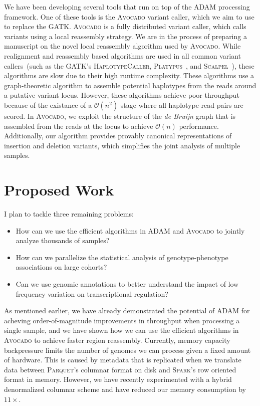 \documentclass[11pt]{article} %
\begin{document}
We have been developing several tools that run on top of the \textsc{ADAM} processing framework.
One of these tools is the \textsc{Avocado} variant caller, which we aim to use to replace the
\textsc{GATK}. \textsc{Avocado} is a fully distributed variant caller, which calls variants using
a local reassembly strategy. We are in the process of preparing a manuscript on the novel local
reassembly algorithm used by \textsc{Avocado}. While realignment and reassembly based algorithms
are used in all common variant callers~(such as the \textsc{GATK}'s \textsc{HaplotypeCaller},
\textsc{Platypus}~\cite{rimmer14}, and \textsc{Scalpel}~\cite{narzisi14}), these algorithms are
slow due to their high runtime complexity. These algorithms use a graph-theoretic algorithm to
assemble potential haplotypes from the reads around a putative variant locus. However, these
algorithms achieve poor throughput because of the existance of a $\mathcal{O}(n^2)$ stage
where all haplotype-read pairs are scored. In \textsc{Avocado}, we exploit the structure of the
\emph{de Bruijn} graph that is assembled from the reads at the locus to achieve $\mathcal{O}(n)$
performance. Additionally, our algorithm provides provably canonical representations of insertion
and deletion variants, which simplifies the joint analysis of multiple samples.

\section{Proposed Work}

I plan to tackle three remaining problems:

\begin{itemize}
\item How can we use the efficient algorithms in \textsc{ADAM} and \textsc{Avocado} to jointly
analyze thousands of samples?
\item How can we parallelize the statistical analysis of genotype-phenotype associations on
large cohorts?
\item Can we use genomic annotations to better understand the impact of low frequency variation
on transcriptional regulation?
\end{itemize}

As mentioned earlier, we have already demonstrated the potential of \textsc{ADAM} for acheving
order-of-magnitude improvements in throughput when processing a single sample, and we have
shown how we can use the efficient algorithms in \textsc{Avocado} to achieve faster region
reassembly. Currently, memory capacity backpressure limits the number of genomes we can process
given a fixed amount of hardware. This is caused by metadata that is replicated when we translate
data between \textsc{Parquet}'s columnar format on disk and \textsc{Spark}'s row oriented format
in memory. However, we have recently experimented with a hybrid denormalized columnar scheme and
have reduced our memory consumption by $11\times$.
\end{document}
